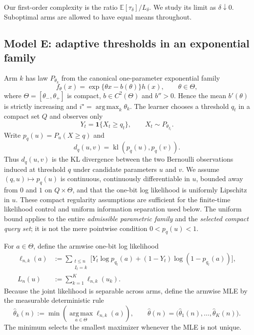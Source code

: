 \documentclass[twoside]{article}
\theoremstyle{definition}
\newcommand{\E}{\mathbb E}
\newcommand{\kl}{\operatorname{kl}}
\newcommand{\1}{\mathbf 1}
\newcommand{\argmax}{\operatorname*{arg\,max}}
\newcommand{\Ldelta}{L_\delta}
\begin{document}
Our first-order complexity is the ratio $\E[\tau_\delta]/\Ldelta$.  We study its limit as $\delta\downarrow0$.  Suboptimal arms are allowed to have equal means throughout.

\subsection{Model E: adaptive thresholds in an exponential family}
Arm $k$ has law $P_{\theta_k}$ from the canonical one-parameter exponential family
\begin{equation}
f_\theta(x)=\exp\{\theta x-b(\theta)\}h(x),\qquad \theta\in\Theta,
\label{eq:expfam}
\end{equation}
where $\Theta=[\theta_-,\theta_+]$ is compact, $b\in C^2(\Theta)$ and $b''>0$.  Hence the mean $b'(\theta)$ is strictly increasing and $i^\star=\argmax_k\theta_k$.  The learner chooses a threshold $q_t$ in a compact set $Q$ and observes only
\[
Y_t=\1\{X_t\ge q_t\},\qquad X_t\sim P_{\theta_{I_t}}.
\]
Write $p_q(u)=P_u(X\ge q)$ and
\begin{equation}
d_q(u,v)=\kl\!\left(p_q(u),p_q(v)\right).
\label{eq:dq-main}
\end{equation}
Thus $d_q(u,v)$ is the KL divergence between the two Bernoulli observations
induced at threshold $q$ under candidate parameters $u$ and $v$.
We assume $(q,u)\mapsto p_q(u)$ is continuous, continuously differentiable in $u$, bounded away from $0$ and $1$ on $Q\times\Theta$, and that the one-bit log likelihood is uniformly Lipschitz in $u$.  These compact regularity assumptions are sufficient for the finite-time likelihood control and uniform information separation used below.
The uniform bound applies to the entire \emph{admissible parametric
family} and the \emph{selected compact query set}; it is not the
mere pointwise condition $0<p_q(u)<1$.

For $a\in\Theta$, define the armwise one-bit log likelihood
\begin{equation}
\begin{aligned}
\ell_{n,k}(a)
&:=
\sum_{\substack{t\le n\\ I_t=k}}
\bigl[
Y_t\log p_{q_t}(a)
+(1-Y_t)\log(1-p_{q_t}(a))
\bigr],\\
L_n(u)&:=\sum_{k=1}^K\ell_{n,k}(u_k).
\end{aligned}
\label{eq:LE-main}
\end{equation}
Because the joint likelihood is separable across arms, define the armwise
MLE by the measurable deterministic rule
\[
\widehat\theta_k(n)
:=
\min\!\left(\argmax_{a\in\Theta}\ell_{n,k}(a)\right),
\qquad
\widehat\theta(n)
=
\bigl(\widehat\theta_1(n),\ldots,\widehat\theta_K(n)\bigr).
\]
The minimum selects the smallest maximizer whenever the MLE is not unique.
\end{document}
